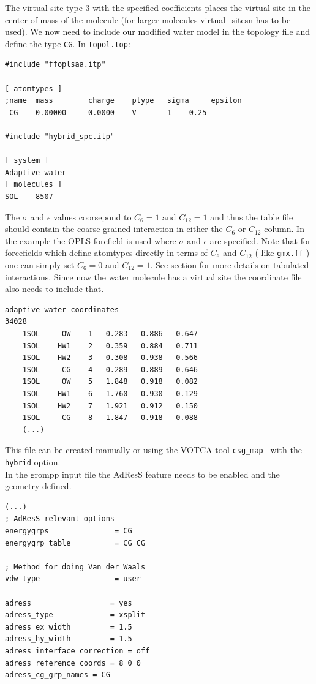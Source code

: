 The virtual site type 3 with the specified coefficients places the virtual site in the center of mass of the molecule (for larger molecules virtual_sitesn has to be used).
We now need to include our modified water model in the topology file and define the type {\tt CG}. In {\tt topol.top}:
{\small
\begin{verbatim}
#include "ffoplsaa.itp"

[ atomtypes ]
;name  mass        charge    ptype   sigma     epsilon
 CG    0.00000     0.0000    V       1    0.25

#include "hybrid_spc.itp"

[ system ]
Adaptive water
[ molecules ]
SOL    8507
\end{verbatim}}
The $\sigma$ and $\epsilon$ values coorsepond to $C_6=1$ and $C_{12}=1$ and thus the table file should contain the coarse-grained interaction in either the $C_6$ or $C_{12}$ column. In the example the OPLS forcfield is used where $\sigma$ and $\epsilon$ are specified.
Note that for forcefields which define atomtypes directly in terms of $C_6$ and $C_{12}$ ( like {\tt gmx.ff} ) one can simply set $C_6=0$ and $C_{12}=1$. See section  for more details on tabulated interactions. Since now the water molecule has a virtual site the coordinate file also needs to include that.
{\small
\begin{verbatim}
adaptive water coordinates
34028
    1SOL     OW    1   0.283   0.886   0.647
    1SOL    HW1    2   0.359   0.884   0.711
    1SOL    HW2    3   0.308   0.938   0.566
    1SOL     CG    4   0.289   0.889   0.646
    1SOL     OW    5   1.848   0.918   0.082
    1SOL    HW1    6   1.760   0.930   0.129
    1SOL    HW2    7   1.921   0.912   0.150
    1SOL     CG    8   1.847   0.918   0.088
    (...)
\end{verbatim}}
This file can be created manually or using the VOTCA tool {\tt csg_map } with the {\tt --hybrid} option.\\
In the grompp input file the AdResS feature needs to be enabled and the geometry defined.
{\small
\begin{verbatim}
(...)
; AdResS relevant options
energygrps               = CG
energygrp_table          = CG CG

; Method for doing Van der Waals
vdw-type                 = user

adress                  = yes
adress_type             = xsplit
adress_ex_width         = 1.5
adress_hy_width         = 1.5
adress_interface_correction = off
adress_reference_coords = 8 0 0
adress_cg_grp_names = CG
\end{verbatim}}

